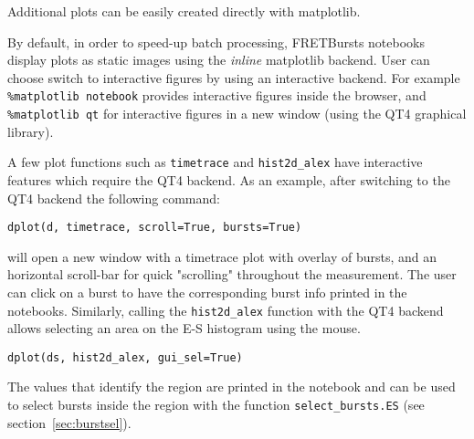 Additional plots can be easily created directly with matplotlib.

By default, in order to speed-up batch processing, FRETBursts notebooks display plots 
as static images using the \textit{inline} matplotlib backend. 
User can choose switch to interactive figures by using an interactive backend. 
For example \verb|%matplotlib notebook| 
provides interactive figures inside the browser, 
and \verb|%matplotlib qt| 
for interactive figures in a new window (using the QT4 graphical library).

A few plot functions such as \verb|timetrace| and \verb|hist2d_alex| have interactive features 
which require the QT4 backend. As an example, after switching to the QT4 backend
the following command:

\begin{verbatim}
dplot(d, timetrace, scroll=True, bursts=True)
\end{verbatim}

\noindent
will open a new window with a timetrace plot with overlay of bursts, and an horizontal scroll-bar for quick
"scrolling" throughout the measurement. The user can click on a burst to have the corresponding burst info 
printed in the notebooks.
Similarly, calling the \verb|hist2d_alex| function with the QT4 backend allows
selecting an area on the E-S histogram using the mouse.

\begin{verbatim}
dplot(ds, hist2d_alex, gui_sel=True)
\end{verbatim}

The values that identify the region are printed in the notebook and can be used 
to select bursts inside the region with the function \verb|select_bursts.ES| (see
section~\ref{sec:burstsel}).
